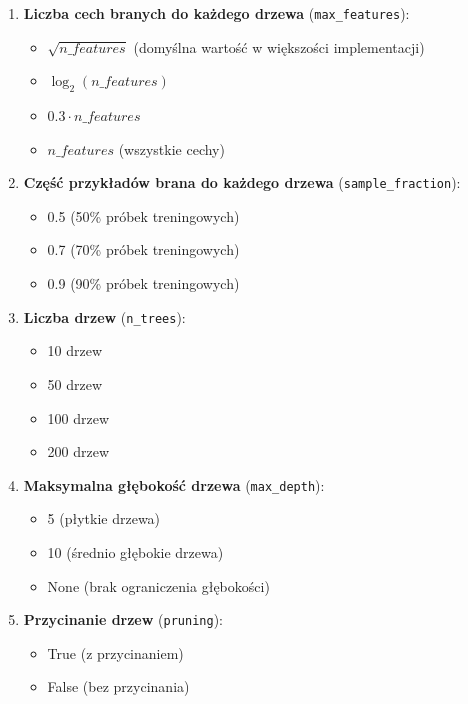 \documentclass[11pt,a4paper]{article}
\begin{document}
\begin{enumerate}
    \item \textbf{Liczba cech branych do każdego drzewa} (\texttt{max\_features}):
    \begin{itemize}
        \item $\sqrt{n\_features}$ (domyślna wartość w większości implementacji)
        \item $\log_2(n\_features)$
        \item $0.3 \cdot n\_features$
        \item $n\_features$ (wszystkie cechy)
    \end{itemize}

    \item \textbf{Część przykładów brana do każdego drzewa} (\texttt{sample\_fraction}):
    \begin{itemize}
        \item 0.5 (50\% próbek treningowych)
        \item 0.7 (70\% próbek treningowych)
        \item 0.9 (90\% próbek treningowych)
    \end{itemize}

    \item \textbf{Liczba drzew} (\texttt{n\_trees}):
    \begin{itemize}
        \item 10 drzew
        \item 50 drzew
        \item 100 drzew
        \item 200 drzew
    \end{itemize}

    \item \textbf{Maksymalna głębokość drzewa} (\texttt{max\_depth}):
    \begin{itemize}
        \item 5 (płytkie drzewa)
        \item 10 (średnio głębokie drzewa)
        \item None (brak ograniczenia głębokości)
    \end{itemize}

    \item \textbf{Przycinanie drzew} (\texttt{pruning}):
    \begin{itemize}
        \item True (z przycinaniem)
        \item False (bez przycinania)
    \end{itemize}


\end{enumerate}
\end{document}

